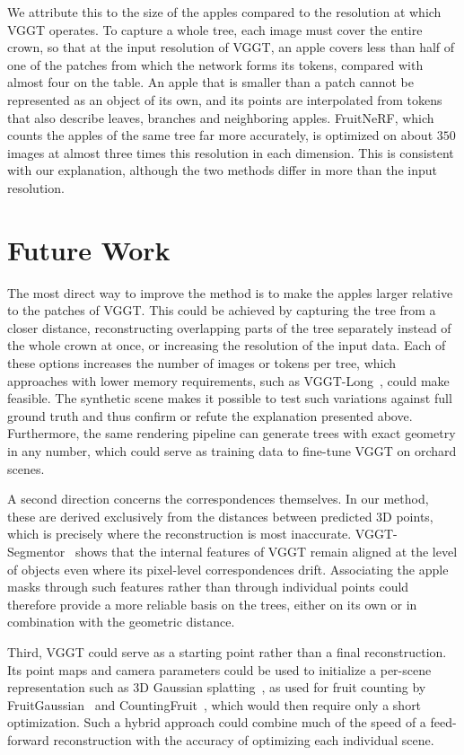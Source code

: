 \documentclass[english, egger, bsc]{vcethesis}
\begin{document}
We attribute this to the size of the apples compared to the resolution at which VGGT operates. To capture a whole tree, each image must cover the entire crown, so that at the input resolution of VGGT, an apple covers less than half of one of the patches from which the network forms its tokens, compared with almost four on the table. An apple that is smaller than a patch cannot be represented as an object of its own, and its points are interpolated from tokens that also describe leaves, branches and neighboring apples. FruitNeRF, which counts the apples of the same tree far more accurately, is optimized on about $350$ images at almost three times this resolution in each dimension. This is consistent with our explanation, although the two methods differ in more than the input resolution.

\section{Future Work}
\label{sec:future_work}
The most direct way to improve the method is to make the apples larger relative to the patches of VGGT. This could be achieved by capturing the tree from a closer distance, reconstructing overlapping parts of the tree separately instead of the whole crown at once, or increasing the resolution of the input data. Each of these options increases the number of images or tokens per tree, which approaches with lower memory requirements, such as VGGT-Long~\cite{deng2025vggtlongchunkitloop}, could make feasible. The synthetic scene makes it possible to test such variations against full ground truth and thus confirm or refute the explanation presented above. Furthermore, the same rendering pipeline can generate trees with exact geometry in any number, which could serve as training data to fine-tune VGGT on orchard scenes.

A second direction concerns the correspondences themselves. In our method, these are derived exclusively from the distances between predicted 3D points, which is precisely where the reconstruction is most inaccurate. VGGT-Segmentor~\cite{gao2026vggts} shows that the internal features of VGGT remain aligned at the level of objects even where its pixel-level correspondences drift. Associating the apple masks through such features rather than through individual points could therefore provide a more reliable basis on the trees, either on its own or in combination with the geometric distance. 

Third, VGGT could serve as a starting point rather than a final reconstruction. Its point maps and camera parameters could be used to initialize a per-scene representation such as 3D Gaussian splatting~\cite{kerbl3Dgaussians}, as used for fruit counting by FruitGaussian~\cite{hong2025} and CountingFruit~\cite{li2025}, which would then require only a short optimization. Such a hybrid approach could combine much of the speed of a feed-forward reconstruction with the accuracy of optimizing each individual scene.

\listoffigures
\listoftables

\printbibliography
\declaration
\end{document}
